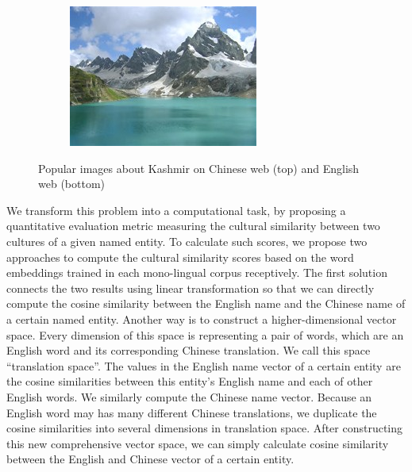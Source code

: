 \begin{figure}[t]
\begin{subfigure}{0.30\columnwidth}
	\end{subfigure}
	\begin{subfigure}{0.30\columnwidth}
		\centering
		\includegraphics[width=\columnwidth]{kashmir3.jpg}
	\end{subfigure}
	\caption{Popular images about Kashmir on Chinese web (top) and
		English web (bottom) \vspace{5pt}}
	\label{fig:kashmir}
\end{figure}

We transform this problem into a computational task,
by proposing a quantitative evaluation metric measuring
the cultural similarity between two cultures of a given named entity.
To calculate such scores, we propose two approaches to compute
the cultural similarity scores based on the word embeddings trained in each mono-lingual corpus receptively.
The first solution connects the two results using linear transformation so that we can directly compute the cosine similarity between the English name and the Chinese name of a certain named entity.
Another way is to construct a higher-dimensional vector space.
Every dimension of this space is representing a pair of words,
which are an English word and its corresponding Chinese translation.
We call this space ``translation space''.
The values in the English name vector of a certain entity are
the cosine similarities between
this entity's English name and each of other English words.
We similarly compute the Chinese name vector.
Because an English word may has many different Chinese translations, we duplicate the cosine similarities into several dimensions in translation space. After constructing this new comprehensive vector space, we can simply calculate cosine similarity between the English and Chinese vector of a certain entity.

